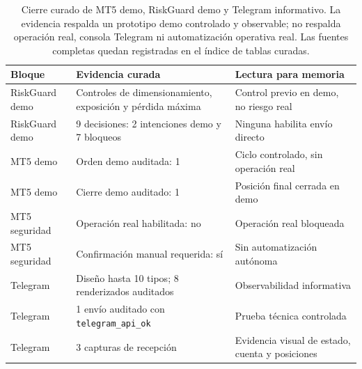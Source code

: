 \begin{table}[H]
\centering
\scriptsize
\setlength{\tabcolsep}{4pt}
\begin{tabular}{p{}p{}p{}}
\hline
Bloque & Evidencia curada & Lectura para memoria \\
\hline
RiskGuard demo & Controles de dimensionamiento, exposici\'on y p\'erdida m\'axima & Control previo en demo, no riesgo real \\
RiskGuard demo & 9 decisiones: 2 intenciones demo y 7 bloqueos & Ninguna habilita env\'io directo \\
MT5 demo & Orden demo auditada: 1 & Ciclo controlado, sin operaci\'on real \\
MT5 demo & Cierre demo auditado: 1 & Posici\'on final cerrada en demo \\
MT5 seguridad & Operaci\'on real habilitada: no & Operaci\'on real bloqueada \\
MT5 seguridad & Confirmaci\'on manual requerida: s\'i & Sin automatizaci\'on aut\'onoma \\
Telegram & Dise\~no hasta 10 tipos; 8 renderizados auditados & Observabilidad informativa \\
Telegram & 1 env\'io auditado con \texttt{telegram\_api\_ok} & Prueba t\'ecnica controlada \\
Telegram & 3 capturas de recepci\'on & Evidencia visual de estado, cuenta y posiciones \\
\hline
\end{tabular}
\caption[Cierre curado de MT5 demo, RiskGuard y Telegram]{Cierre curado de MT5 demo, RiskGuard demo y Telegram informativo. La evidencia respalda un prototipo demo controlado y observable; no respalda operaci\'on real, consola Telegram ni automatizaci\'on operativa real. Las fuentes completas quedan registradas en el \'indice de tablas curadas.}
\label{tab:mt5-riskguard-telegram-cierre}
\end{table}
